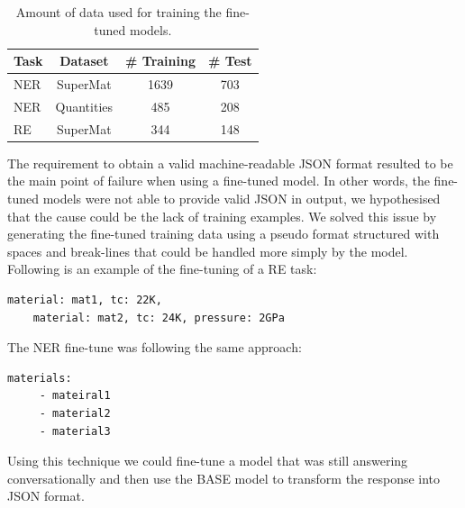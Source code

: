 \documentclass[a4paper]{article}
\begin{document}
\begin{table}[htbp]
    \centering
    \label{tab:amount-data-fine-tuned}
    \caption{Amount of data used for training the fine-tuned models.}
    \begin{tabular}{lccc}
        Task & Dataset & \# Training & \# Test \\
        \toprule
        NER & SuperMat   & 1639 & 703 \\
        NER & Quantities & 485 & 208 \\
        RE  & SuperMat   & 344 & 148 \\
        \bottomrule
    \end{tabular}
\end{table}

The requirement to obtain a valid machine-readable JSON format resulted to be the main point of failure when using a fine-tuned model. 
In other words, the fine-tuned models were not able to provide valid JSON in output, we hypothesised that the cause could be the lack of training examples. 
We solved this issue by generating the fine-tuned training data using a pseudo format structured with spaces and break-lines that could be handled more simply by the model. 
Following is an example of the fine-tuning of a RE task: 
\begin{lstlisting}[caption=Example of fine-tuning format for the expected answer for RE]
    material: mat1, tc: 22K, 
    material: mat2, tc: 24K, pressure: 2GPa
\end{lstlisting}

The NER fine-tune was following the same approach: 

\begin{lstlisting}[caption=Example of fine-tuning format for the expected answer for NER]
    materials: 
     - mateiral1
     - material2
     - material3
\end{lstlisting}

Using this technique we could fine-tune a model that was still answering conversationally and then use the BASE model to transform the response into JSON format. 

\end{document}
